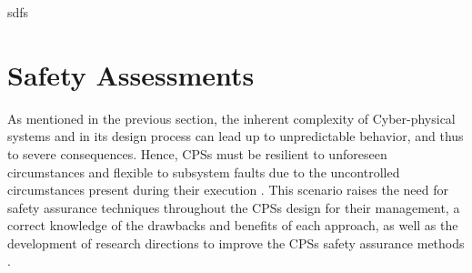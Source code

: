sdfs

\section{Safety Assessments}

As mentioned in the previous section, the inherent complexity of Cyber-physical systems and in its design process can lead up to unpredictable behavior, and thus to severe consequences. Hence, CPSs must be resilient to unforeseen circumstances and flexible to subsystem faults due to the uncontrolled circumstances present during their execution \cite{lee2008cyber}. This scenario raises the need for safety assurance techniques throughout the CPSs design for their management, a correct knowledge of the drawbacks and benefits of each approach, as well as the development of research directions to improve the CPSs safety assurance methods \cite{bolbot2019vulnerabilities}.




